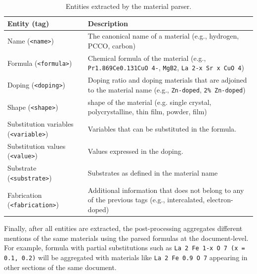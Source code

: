 \begin{table}[ht]
    \caption{Entities extracted by the material parser. }

    \begin{tabular}{m{16em} m{30em}}
        \toprule
        \textbf{Entity} (\textbf{tag})               & \textbf{Description}                                                                                                              \\
        \midrule
        Name (\texttt{<name>})                       & The canonical name of a material (e.g., hydrogen, PCCO, carbon)                                                                    \\
        Formula (\texttt{<formula>})                 & Chemical formula of the material (e.g., \texttt{Pr1.869Ce0.131CuO 4-}, \texttt{MgB2}, \texttt{La 2-x Sr x CuO 4})                  \\
        Doping (\texttt{<doping>})                   & Doping ratio and doping materials that are adjoined to the material name (e.g., \texttt{Zn-doped}, \texttt{2\% Zn-doped})          \\
        Shape (\texttt{<shape>})                     & shape of the material (e.g. single crystal, polycrystalline, thin film, powder, film)                                             \\
        Substitution variables (\texttt{<variable>}) & Variables that can be substituted in the formula.                                                                                 \\
        Substitution values (\texttt{<value>})       & Values expressed in the doping.                                                                                                   \\
        Substrate (\texttt{<substrate>})             & Substrates as defined in the material name                                                                                        \\
        Fabrication (\texttt{<fabrication>})         & Additional information that does not belong to any of the previous tags  (e.g., intercalated, electron-doped) \\
        \bottomrule
    \end{tabular}
    
    \label{tab:material-parser-entities}
\end{table}

Finally, after all entities are extracted, the post-processing aggregates different mentions of the same materials using the parsed formulas at the document-level.
For example, formula with partial substitutions such as \texttt{La 2 Fe 1-x O 7 (x = 0.1, 0.2)} will be aggregated with materials like \texttt{La 2 Fe 0.9 O 7} appearing in other sections of the same document.

